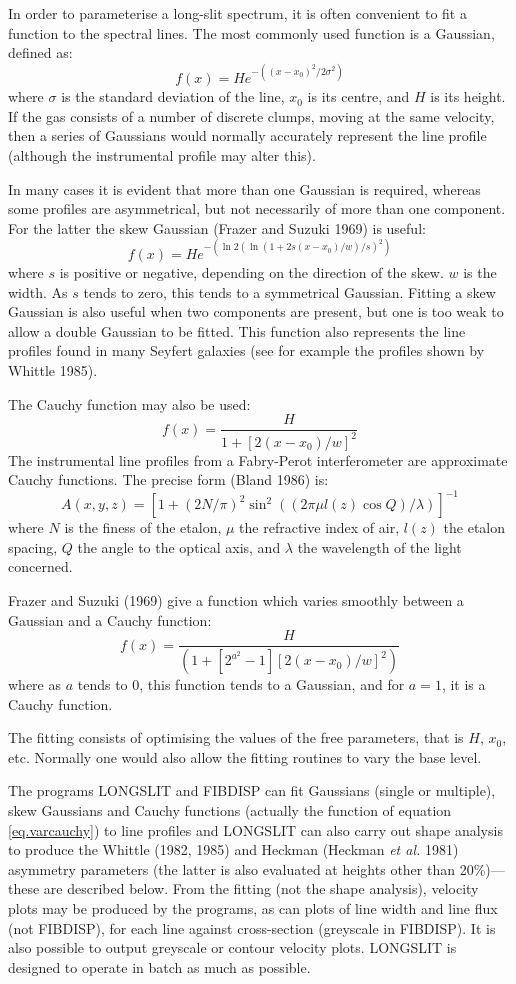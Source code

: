 In order to parameterise a long-slit spectrum, it is often
convenient to fit a function to the spectral lines.
The most commonly used function is a Gaussian, defined as:
\[
     f(x) = H e^{-((x-x_{0})^{2}/2\sigma^{2})}
\]
where $\sigma$ is the standard deviation of the line, $x_{0}$ is its
centre, and $H$ is its height.
If the gas consists of a number of discrete clumps, moving at the same
velocity, then a series of Gaussians would normally accurately represent
the line profile (although the instrumental profile may alter this).

In many cases it is evident that more than one
Gaussian is required, whereas some profiles are asymmetrical, but not
necessarily of more than one component.
For the latter the skew Gaussian (Frazer and Suzuki 1969) is useful:
\[
     f(x) = H e^{-(\ln 2(\ln (1+2s(x-x_{0})/w)/s)^{2})}
\]
where $s$ is positive or negative, depending on the direction of the
skew.
$w$ is the width.
As $s$ tends to zero, this tends to a symmetrical Gaussian.
Fitting a skew Gaussian is also useful when two components are present,
but one is too weak to allow a double Gaussian to be fitted.
This function also represents the line profiles found in many Seyfert
galaxies (see for example the profiles shown by Whittle 1985).

The Cauchy function may also be used:
\[
     f(x) = \frac{H}{1+[2(x-x_{0})/w]^{2}}
\]
The instrumental line profiles from a Fabry-Perot interferometer are
approximate Cauchy functions.
The precise form (Bland 1986) is:
\[
A(x,y,z) =
[1+(2N/\pi )^{2}\sin^{2}((2\pi \mu l(z)\cos Q)/\lambda )]^{-1}
\]
where $N$ is the finess of the etalon, $\mu$ the refractive index of
air, $l(z)$ the etalon spacing, $Q$ the angle to the optical axis, and
$\lambda$ the wavelength of the light concerned.

Frazer and Suzuki (1969) give a function which varies smoothly between a
Gaussian and a Cauchy function:
\begin{equation}
     f(x) = \frac{H}{(1+[2^{a^{2}}-1][2(x-x_{0})/w]^{2})}
\label{eq.varcauchy}
\end{equation}
where as $a$ tends to 0, this function tends to a Gaussian, and for
$a=1$, it is a Cauchy function.

The fitting consists of optimising the values of the free parameters,
that is $H$, $x_{0}$, etc.
Normally one would also allow the fitting routines to vary the base
level.

The programs LONGSLIT and FIBDISP can fit Gaussians (single or
multiple), skew Gaussians and Cauchy functions (actually the function of
equation \ref{eq.varcauchy}) to line profiles and LONGSLIT can also
carry out shape analysis to produce the Whittle (1982, 1985) and Heckman
(Heckman {\it et al.} 1981) asymmetry parameters (the latter is also
evaluated at heights other than 20\%)---these are described below.
From the fitting (not the shape analysis), velocity plots may be
produced by the programs, as can plots of line width and line flux (not
FIBDISP), for each line against cross-section (greyscale in FIBDISP).
It is also possible to output greyscale or contour velocity plots.
LONGSLIT is designed to operate in batch as much as possible.

